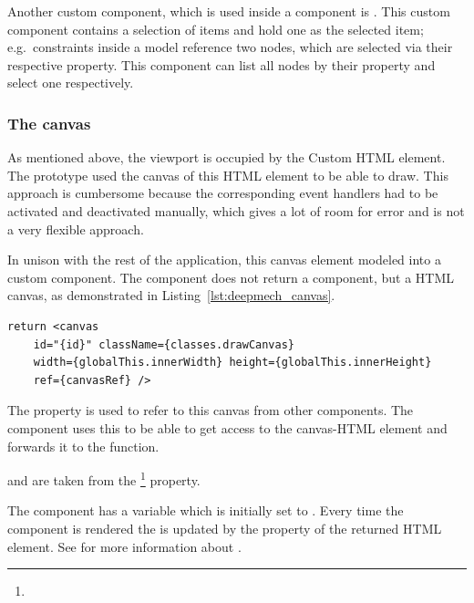 Another custom component, which is used inside a  component is .
This custom component contains a selection of items and hold one as the selected item; e.g.\ constraints inside a  model reference two nodes, which are selected via their respective  property.
This component can list all nodes by their  property and select one respectively.

\subsubsection{The canvas}

As mentioned above, the viewport is occupied by the  Custom HTML element.
The prototype used the canvas of this HTML element to be able to draw.
This approach is cumbersome because the corresponding event handlers had to be activated and deactivated manually, which gives a lot of room for error and is not a very flexible approach.

In unison with the rest of the application, this canvas element modeled into a custom component.
The  component does not return a  component, but a HTML canvas, as demonstrated in Listing~\ref{lst:deepmech_canvas}.

\begin{lstlisting}[label={lst:deepmech_canvas}, caption={Return of the \code{DeepmechCanvas} component.}]
return <canvas
    id="{id}" className={classes.drawCanvas}
    width={globalThis.innerWidth} height={globalThis.innerHeight}
    ref={canvasRef} />
\end{lstlisting}

The  property is used to refer to this canvas from other components.
The  component uses this  to be able to get access to the canvas-HTML element and forwards it to the  function.

 and  are taken from the \footnote{} property.

The  component has a  variable which is initially set to .
Every time the  component is rendered the  is updated by the  property of the returned HTML element.
See  for more information about .

